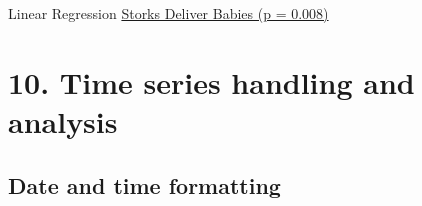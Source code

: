 \documentclass[xcolor=table,           xcolor=dvipsnames]{beamer}\usepackage[]{graphicx}\usepackage[]{color}
\begin{document}

\begin{frame}[fragile]{Linear Regression}
\href{http://www.econ.queensu.ca/files/other/storks.pdf}{Storks Deliver Babies (p = 0.008)}
\end{frame}

\section{10. Time series handling and analysis}

\subsection{Date and time formatting}
\end{document}
